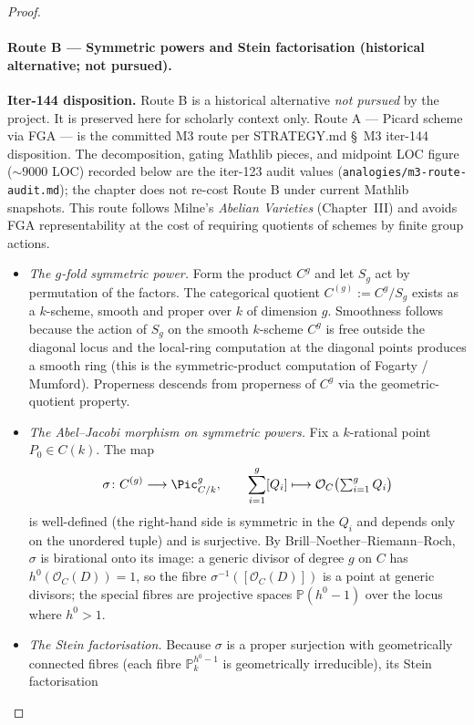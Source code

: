\begin{proof}
  \paragraph{Route B --- Symmetric powers and Stein factorisation (historical alternative; not pursued).}
  \textbf{Iter-144 disposition.} Route B is a historical alternative \emph{not pursued} by the project. It is preserved here for scholarly context only. Route A --- Picard scheme via FGA --- is the committed M3 route per STRATEGY.md \S~M3 iter-144 disposition. The decomposition, gating Mathlib pieces, and midpoint LOC figure (\(\sim 9000\) LOC) recorded below are the iter-123 audit values (\texttt{analogies/m3-route-audit.md}); the chapter does not re-cost Route B under current Mathlib snapshots.
  This route follows Milne's \emph{Abelian Varieties} (Chapter~III) and avoids FGA representability at the cost of requiring quotients of schemes by finite group actions.
  \begin{itemize}
    \item[\textbf{(B.1)}] \emph{The \(g\)-fold symmetric power.} Form the product \(C^g\) and let \(S_g\) act by permutation of the factors. The categorical quotient \(C^{(g)} := C^g / S_g\) exists as a \(k\)-scheme, smooth and proper over \(k\) of dimension \(g\). Smoothness follows because the action of \(S_g\) on the smooth \(k\)-scheme \(C^g\) is free outside the diagonal locus and the local-ring computation at the diagonal points produces a smooth ring (this is the symmetric-product computation of Fogarty / Mumford). Properness descends from properness of \(C^g\) via the geometric-quotient property.
    \item[\textbf{(B.2)}] \emph{The Abel--Jacobi morphism on symmetric powers.} Fix a \(k\)-rational point \(P_0 \in C(k)\). The map
    \[
      \sigma \colon C^{(g)} \longrightarrow \Pic^g_{C/k}, \qquad
      \sum_{i=1}^g [Q_i] \longmapsto \mathcal O_C\bigl(\textstyle\sum_{i=1}^g Q_i\bigr)
    \]
    is well-defined (the right-hand side is symmetric in the \(Q_i\) and depends only on the unordered tuple) and is surjective. By Brill--Noether--Riemann--Roch, \(\sigma\) is birational onto its image: a generic divisor of degree \(g\) on \(C\) has \(h^0(\mathcal O_C(D)) = 1\), so the fibre \(\sigma^{-1}([\mathcal O_C(D)])\) is a point at generic divisors; the special fibres are projective spaces \(\mathbb P(h^0 - 1)\) over the locus where \(h^0 > 1\).
    \item[\textbf{(B.3)}] \emph{The Stein factorisation.} Because \(\sigma\) is a proper surjection with geometrically connected fibres (each fibre \(\mathbb P^{h^0-1}_k\) is geometrically irreducible), its Stein factorisation

\end{itemize}
\end{proof}
